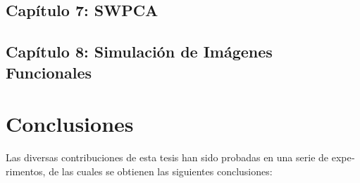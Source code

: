 \begin{otherlanguage}{spanish}
\subsection*{Capítulo 7: \acf{SWPCA}}
\cite{Martinez-Murcia2016a}

\subsection*{Capítulo 8: Simulación de Imágenes Funcionales}

\section*{Conclusiones}
Las diversas contribuciones de esta tesis han sido probadas en una serie de experimentos, de las cuales se obtienen las siguientes conclusiones: 


\end{otherlanguage}
